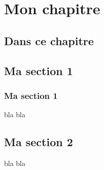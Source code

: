 \documentclass[twoside]{report}
\begin{document}
\chapter{Mon chapitre}
  \section*{Dans ce chapitre}
    \minitoc
  \section{Ma section 1}
    \subsection{Ma section 1}
      bla bla
  \section{Ma section 2}
    bla bla
\end{document}
